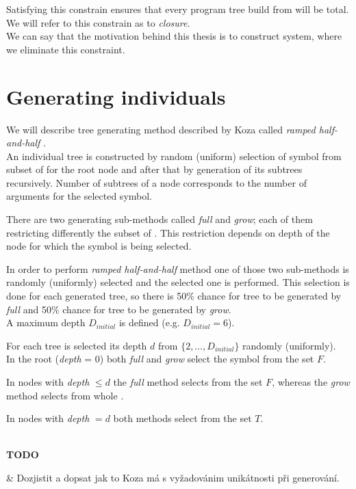 \documentclass[12pt,a4paper]{report}
\newcommand{\setDots}[2]{ 
	\lbrace #1 , \dots , #2 \rbrace
}
\newenvironment{todo}
{ ~\\[0.5em]
  {\color{red}\textbf{TODO}}
  \begin{easylist}[itemize]}
{ \end{easylist}
  ~}
\begin{document}
Satisfying this constrain ensures that every program tree build 
from \TuF will be total. We will refer to this constrain as to \textit{closure}.\\

We can say that the motivation behind this thesis is to construct system,
where we eliminate this constraint. 

\section{Generating individuals}
\label{GPgene}

We will describe tree generating method described by Koza 
called \textit{ramped half-and-half}  \cite{koza92}. \\

An individual tree is constructed by random (uniform) selection of symbol from 
subset of \TuF for the root node and after that by generation of its 
subtrees recursively. 
Number of subtrees of a node corresponds 
to the number of arguments for the selected symbol. 

There are two generating sub-methods called \textit{full} and 
\textit{grow}; each of them restricting differently the subset of \TuF. 
This restriction depends on depth of the
node for which the symbol is being selected. 

In order to perform \textit{ramped half-and-half} method
one of those two sub-methods is randomly (uniformly) 
selected and the selected one is performed.
This selection is done for each generated tree, so there
is 50\% chance for tree to be generated by \textit{full} 
and 50\% chance for tree to be generated by \textit{grow}.\\


A maximum depth $D_{initial}$ is defined (e.g. $D_{initial} = 6$).

For each tree is selected its 
depth $d$ from $\setDots{2}{D_{initial}}$ randomly (uniformly).\\


In the root (\textit{depth} = 0) both \textit{full} and \textit{grow}
select the symbol from the set $F$.

In nodes with \textit{depth} $\leq d$ the \textit{full}
method selects from the set $F$, whereas the \textit{grow} method 
selects from whole \TuF.

In nodes with \textit{depth} $= d$ both methods select from the
set $T$.

\begin{todo}
 & Dozjistit a dopsat jak to Koza má s vyžadovánim unikátnosti při generování.
\end{todo}
\end{document}
